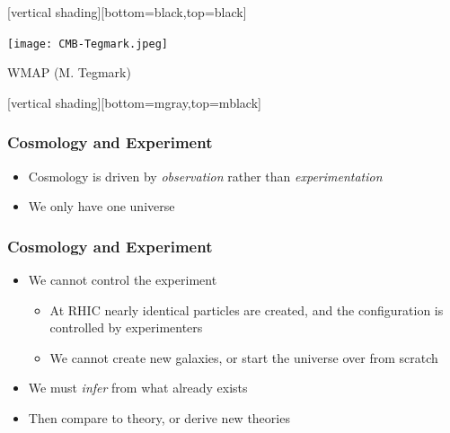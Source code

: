 \documentclass{beamer}
\begin{document}
{
    [vertical shading][bottom=black,top=black]


    \frame
    {
        \begin{center}
            \texttt{[image: CMB-Tegmark.jpeg]}
        \end{center}
        {\tiny \hfill WMAP (M. Tegmark)}
    }
    [vertical shading][bottom=mgray,top=mblack]

}

\frame
{
    \frametitle{Cosmology and Experiment}

 
    \begin{itemize}

        \item Cosmology is driven by {\color{gold} {\em observation}} rather than {\em experimentation}
        \item We only have one universe
    \end{itemize}

}

\frame
{
    \frametitle{Cosmology and Experiment}

 
    \begin{itemize}

        \item We cannot control the experiment
        \begin{itemize}
            \item At RHIC nearly identical particles are created, and the configuration
                is controlled by experimenters 
            \item We cannot create new galaxies, or start the universe over from scratch
        \end{itemize}
        \item We must {\em infer} from what already exists

        \item Then compare to theory, or derive new theories

    \end{itemize}

}
\end{document}

